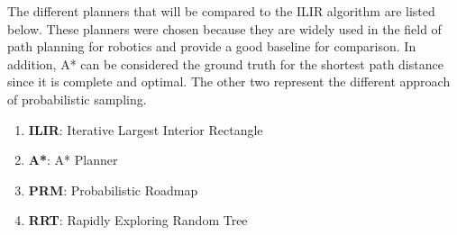 The different planners that will be compared to the ILIR algorithm are listed below. These planners were chosen because they are widely used in the field of path planning for robotics and provide a good baseline for comparison. In addition, A* can be considered the ground truth for the shortest path distance since it is complete and optimal. The other two represent the different approach of probabilistic sampling.

\begin{enumerate}
    \item \textbf{ILIR}: Iterative Largest Interior Rectangle
    \item \textbf{A*}: A* Planner
    \item \textbf{PRM}: Probabilistic Roadmap
    \item \textbf{RRT}: Rapidly Exploring Random Tree
\end{enumerate}

